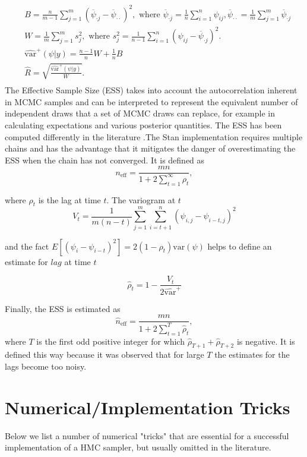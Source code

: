 \documentclass[12pt]{report}
\begin{document}
\begin{align*}
&B = \frac{n}{m-1} \sum_{j=1}^{m}(\overline{\psi}_{\cdot j} - \overline{\psi}_{\cdot \cdot})^2, \text{ where } 
\overline{\psi}_{\cdot j} = \frac{1}{n} \sum_{i=1}^n \psi_{ij} , \overline{\psi}_{\cdot \cdot} = \frac{1}{m} \sum_{j=1}^m \overline{\psi}_{\cdot j }
 \\
&W = \frac{1}{m} \sum_{j=1}^m s_j^2 , \text{ where }
s_j^2 = \frac{1}{n-1} \sum_{i=1}^n (\psi_{ij} - \overline{\psi}_{\cdot j } )^2.\\
& \hat{\text{var}}^+(\psi|y) = \frac{n-1}{n} W + \frac{1}{n} B \\
& \hat{R} = \sqrt{\frac{\hat{\text{var}}^+(\psi|y)}{W}}. \\
\end{align*}
The Effective Sample Size (ESS) takes into account the autocorrelation inherent in MCMC samples and can be interpreted to represent the equivalent number of independent draws that a set of MCMC draws can replace, for example in calculating expectations and various posterior quantities. The ESS has been computed  differently in the literature .The Stan implementation requires multiple chains and has the advantage that it mitigates the danger of overestimating the ESS when the chain has not converged. It is defined as 
\[n_{\text{eff}}  = \frac{mn}{1 + 2 \sum_{t=1}^\infty \rho_t}, \]

where  $\rho_t$ is the lag at time $t$. The variogram at $t$ 
\[V_t = \frac{1}{m(n-t)} \sum_{j=1}^m \sum_{i=t+1}^n (\psi_{i,j} - \psi_{i-t,j})^2 \]

and the fact $E[(\psi_i - \psi_{i-t})^2] = 2(1-\rho_t)\text{var}(\psi)$ helps to define an estimate for $lag$ at time $t$ 

\[\hat{\rho}_t = 1 - \frac{V_t}{2 \hat{\text{var}}^+}\]

Finally, the ESS is estimated as 
\[\hat{n}_{\text{eff}} = \frac{mn}{1 + 2 \sum_{t=1}^T \hat{\rho}_t}, \]
where $T$ is the first odd positive integer for which $\hat{\rho}_{T+1} + \hat{\rho}_{T+2} $ is negative. It is defined this way because it was observed that for large $T$ the estimates for the lags become too noisy. 
 
\section{Numerical/Implementation Tricks}

Below we list a number of numerical "tricks" that are essential for a successful implementation of a HMC sampler, but usually omitted in the literature. 
\end{document}
